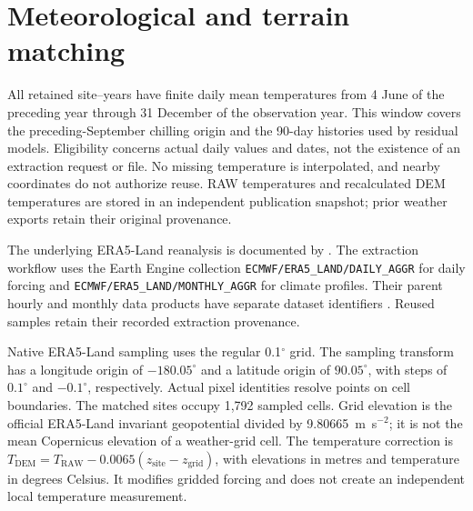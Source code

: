 \documentclass[a4paper,11pt]{article}
\let\OriginalSection\section
\renewcommand{\section}{\FloatBarrier\OriginalSection}
\begin{document}
\begin{table}[!htbp]
\centering
\caption{Frozen modelling population by country and BBCH stage. Sites are
source-qualified reported identifiers; site--years count distinct site and
calendar-year pairs. Zero denotes absence of eligible observations. Stage
columns contain observation counts, including accepted repeated observations.}
\label{tab:country_population}
\small
\resizebox{\textwidth}{!}{}
\end{table}

\section{Meteorological and terrain matching}

All retained site--years have finite daily mean temperatures from 4 June of
the preceding year through 31 December of the observation year. This window
covers the preceding-September chilling origin and the 90-day histories used
by residual models. Eligibility concerns actual daily values and dates, not
the existence of an extraction request or file. No missing temperature is
interpolated, and nearby coordinates do not authorize reuse. RAW temperatures
and recalculated DEM temperatures are stored in an independent publication
snapshot; prior weather exports retain their original provenance.

The underlying ERA5-Land reanalysis is documented by
\citet{munozSabaterERA5Land2021}. The extraction workflow uses the Earth Engine
collection \texttt{ECMWF/ERA5\_LAND/DAILY\_AGGR} for daily forcing and
\texttt{ECMWF/ERA5\_LAND/MONTHLY\_AGGR} for climate profiles. Their parent hourly
and monthly data products have separate dataset identifiers
\citep{copernicusClimateChangeServiceERA5LandHourly2019,copernicusClimateChangeServiceERA5LandMonthly2019}.
Reused samples retain their recorded extraction provenance.

Native ERA5-Land sampling uses the regular 0.1$^{\circ}$ grid. The sampling
transform has a longitude origin of $-180.05^{\circ}$ and a latitude origin
of $90.05^{\circ}$, with steps of $0.1^{\circ}$ and $-0.1^{\circ}$,
respectively. Actual pixel identities resolve points on cell boundaries.
The matched sites occupy 1,792 sampled cells. Grid elevation is the official
ERA5-Land invariant geopotential divided by 9.80665~m~s$^{-2}$; it is not the
mean Copernicus elevation of a weather-grid cell. The temperature correction is
$T_{\mathrm{DEM}}=T_{\mathrm{RAW}}-0.0065(z_{\mathrm{site}}-z_{\mathrm{grid}})$,
with elevations in metres and temperature in degrees Celsius. It modifies
gridded forcing and does not create an independent local temperature measurement.
\end{document}
